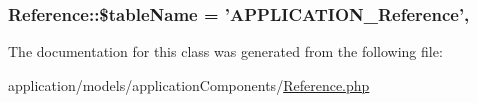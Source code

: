 \hypertarget{class_reference_ac0ffc7c20c20f31a011368f038760024}{
\subsubsection[{\$table\-Name}]{\setlength{\rightskip}{0pt plus 5cm}Reference\-::\$table\-Name = 'A\-P\-P\-L\-I\-C\-A\-T\-I\-O\-N\-\_\-\-Reference'\hspace{0.3cm}{\ttfamily [static]}, {\ttfamily [protected]}}}\label{class_reference_ac0ffc7c20c20f31a011368f038760024}


The documentation for this class was generated from the following file\-:\begin{DoxyCompactItemize}
\item 
application/models/application\-Components/\hyperlink{_reference_8php}{Reference.\-php}\end{DoxyCompactItemize}
